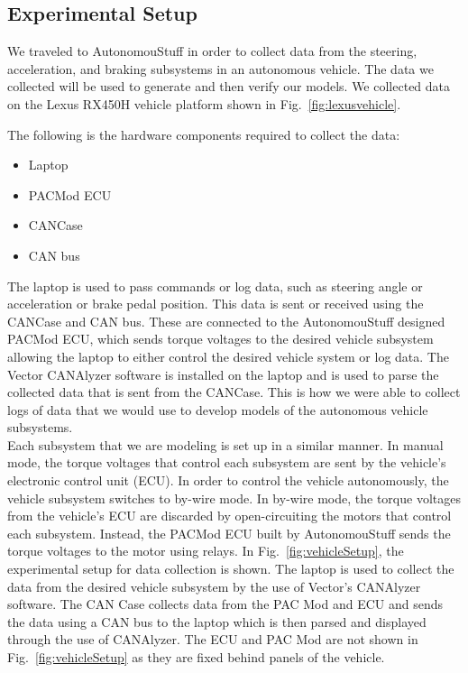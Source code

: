 \documentclass[journal,twoside,web]{ieeecolor}
\begin{document}
\subsection{Experimental Setup}
\label{sec:experimentalSetup}

We traveled to AutonomouStuff in order to collect
data from the steering, acceleration, and braking subsystems in an autonomous
vehicle. The data we collected will be used to generate and then verify our
models. We collected data on the Lexus RX450H vehicle platform shown in
Fig.~\ref{fig:lexusvehicle}. %


\noindent The following is the hardware components required to collect the data:  
	\begin{itemize}
    		\item Laptop
    		\item PACMod ECU
    		\item CANCase 
    		\item CAN bus 
 	\end{itemize}
 	
 	
\noindent The laptop is used to pass commands or log data, such as steering angle or acceleration or brake pedal position. This data is sent or received using the CANCase and CAN bus. These are connected to the AutonomouStuff designed PACMod ECU, which sends torque voltages to the desired vehicle subsystem allowing the laptop to either control the desired vehicle system or log data. The Vector CANAlyzer software is installed on the laptop and is used to parse the collected data that is sent from the CANCase. This is how we were able to collect logs of data that we would use to develop models of the autonomous vehicle subsystems.
\\

Each subsystem that we are modeling is set up in a similar manner. In manual mode, the torque voltages that control each subsystem are sent by the vehicle's electronic control unit (ECU). In order to control the vehicle autonomously, the vehicle subsystem switches to by-wire mode. In by-wire mode, the torque voltages from the vehicle's ECU are discarded by open-circuiting the motors that control each subsystem. Instead, the PACMod ECU built by AutonomouStuff sends the torque voltages to the motor using relays. In Fig.~\ref{fig:vehicleSetup}, the experimental setup for data collection is shown. The laptop is used to collect the data from the desired vehicle subsystem by the use of Vector's CANAlyzer software. The CAN Case collects data from the PAC Mod and ECU and sends the data using a CAN bus to the laptop which is then parsed and displayed through the use of CANAlyzer. The ECU and PAC Mod are not shown in Fig.~\ref{fig:vehicleSetup} as they are fixed behind panels of the vehicle. 
\\
\end{document}
